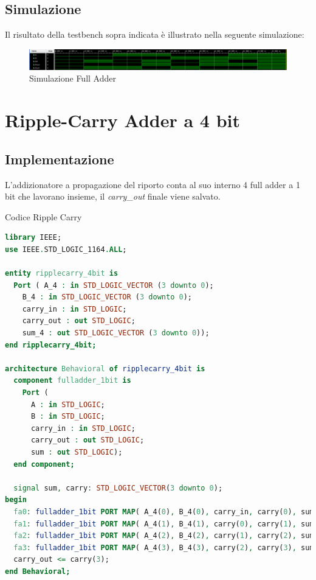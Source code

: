 \subsection{Simulazione}
Il risultato della testbench sopra indicata è illustrato nella seguente simulazione:
\begin{figure}[ht]
    \center
    \includegraphics[width=16cm]{resources/fulladder_sim.png}
    \caption{Simulazione Full Adder}
    \label{fig:simulation_full adder}
\end{figure}

\newpage

\section{Ripple-Carry Adder a 4 bit}
\subsection{Implementazione}
L'addizionatore a propagazione del riporto conta al suo interno 4 full adder a 1 bit che lavorano insieme, il \textit{carry\_out} finale viene salvato.

\begin{problem}{Codice Ripple Carry}{}
\begin{lstlisting}[language=VHDL]
library IEEE;
use IEEE.STD_LOGIC_1164.ALL;

entity ripplecarry_4bit is
  Port ( A_4 : in STD_LOGIC_VECTOR (3 downto 0);
    B_4 : in STD_LOGIC_VECTOR (3 downto 0);
    carry_in : in STD_LOGIC;
    carry_out : out STD_LOGIC;
    sum_4 : out STD_LOGIC_VECTOR (3 downto 0));
end ripplecarry_4bit;

architecture Behavioral of ripplecarry_4bit is
  component fulladder_1bit is
    Port ( 
      A : in STD_LOGIC;
      B : in STD_LOGIC;
      carry_in : in STD_LOGIC;
      carry_out : out STD_LOGIC;
      sum : out STD_LOGIC);
  end component;
    
  signal sum, carry: STD_LOGIC_VECTOR(3 downto 0);
begin
  fa0: fulladder_1bit PORT MAP( A_4(0), B_4(0), carry_in, carry(0), sum_4(0) );
  fa1: fulladder_1bit PORT MAP( A_4(1), B_4(1), carry(0), carry(1), sum_4(1) );
  fa2: fulladder_1bit PORT MAP( A_4(2), B_4(2), carry(1), carry(2), sum_4(2) );
  fa3: fulladder_1bit PORT MAP( A_4(3), B_4(3), carry(2), carry(3), sum_4(3) );
  carry_out <= carry(3);
end Behavioral;
\end{lstlisting}
\end{problem}

